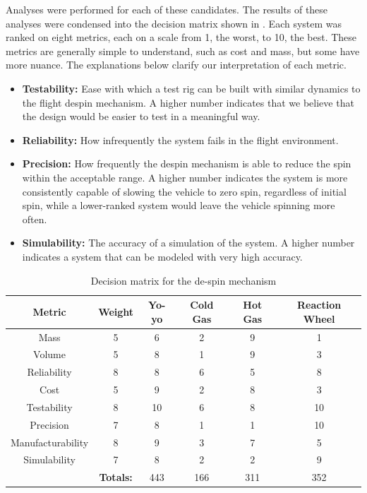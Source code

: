 Analyses were performed for each of these candidates. The results of these analyses were condensed into the decision matrix shown in . Each system was ranked on eight metrics, each on a scale from 1, the worst, to 10, the best. These metrics are generally simple to understand, such as cost and mass, but some have more nuance. The explanations below clarify our interpretation of each metric.

\begin{itemize}
    \item \textbf{Testability:} Ease with which a test rig can be built with similar dynamics to the flight despin mechanism. A higher number indicates that we believe that the design would be easier to test in a meaningful way.
    \item \textbf{Reliability:} How infrequently the system fails in the flight environment.
    \item \textbf{Precision:} How frequently the despin mechanism is able to reduce the spin within the acceptable range. A higher number indicates the system is more consistently capable of slowing the vehicle to zero spin, regardless of initial spin, while a lower-ranked system would leave the vehicle spinning more often.
    \item \textbf{Simulability:} The accuracy of a simulation of the system. A higher number indicates a system that can be modeled with very high accuracy.
\end{itemize}

\begin{table}
    \centering
    \begin{tabular}{cc||cccc}
        \textbf{Metric} & \textbf{Weight} & Yo-yo & Cold Gas & Hot Gas & Reaction Wheel \\ \hline
        Mass & 5 & 6 & 2 & 9 & 1 \\ 
        Volume & 5 & 8 & 1 & 9 & 3 \\ 
        Reliability & 8 & 8 & 6 & 5 & 8 \\ 
        Cost & 5 & 9 & 2 & 8 & 3 \\ 
        Testability & 8 & 10 & 6 & 8 & 10 \\ 
        Precision & 7 & 8 & 1 & 1 & 10 \\ 
        Manufacturability & 8 & 9 & 3 & 7 & 5 \\ 
        Simulability & 7 & 8 & 2 & 2 & 9 \\ \hline 
         & \textbf{Totals:} & 443 & 166 & 311 & 352
    \end{tabular}
    \caption{Decision matrix for the de-spin mechanism}
    \label{table:despin-design-matrix}
\end{table}

